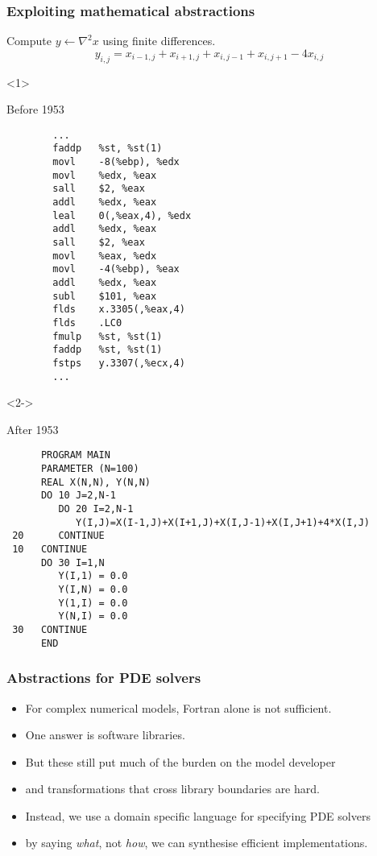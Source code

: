 \documentclass[presentation]{beamer}
\begin{document}
\begin{frame}[fragile]
  \frametitle{Exploiting mathematical abstractions}
  Compute $y \leftarrow \nabla^2 x$ using finite differences.
  \begin{equation*}
    y_{i,j} = x_{i-1, j} + x_{i+1, j} + x_{i, j-1} + x_{i, j+1} - 4x_{i,j}    
  \end{equation*}
  \begin{overlayarea}{\textwidth}{0.8\textheight}
  \begin{onlyenv}<1>
    \begin{block}{Before 1953}
\begin{verbatim}
        ...
        faddp   %st, %st(1)
        movl    -8(%ebp), %edx
        movl    %edx, %eax
        sall    $2, %eax
        addl    %edx, %eax
        leal    0(,%eax,4), %edx
        addl    %edx, %eax
        sall    $2, %eax
        movl    %eax, %edx
        movl    -4(%ebp), %eax
        addl    %edx, %eax
        subl    $101, %eax
        flds    x.3305(,%eax,4)
        flds    .LC0
        fmulp   %st, %st(1)
        faddp   %st, %st(1)
        fstps   y.3307(,%ecx,4)
        ...
\end{verbatim}
    \end{block}
  \end{onlyenv}
  \begin{onlyenv}<2->
    \begin{block}{After 1953}
\begin{verbatim}
      PROGRAM MAIN
      PARAMETER (N=100)
      REAL X(N,N), Y(N,N)
      DO 10 J=2,N-1
         DO 20 I=2,N-1
            Y(I,J)=X(I-1,J)+X(I+1,J)+X(I,J-1)+X(I,J+1)+4*X(I,J)
 20      CONTINUE
 10   CONTINUE
      DO 30 I=1,N
         Y(I,1) = 0.0
         Y(I,N) = 0.0
         Y(1,I) = 0.0
         Y(N,I) = 0.0
 30   CONTINUE
      END
\end{verbatim}
    \end{block}
  \end{onlyenv}
  \end{overlayarea}
\end{frame}

\begin{frame}
  \frametitle{Abstractions for PDE solvers}
  \begin{itemize}
  \item For complex numerical models, Fortran alone is not sufficient.
  \item One answer is software libraries.
  \item But these still put much of the burden on the model developer
  \item and transformations that cross library boundaries are hard.
  \item Instead, we use a domain specific language for specifying PDE
    solvers
  \item by saying \emph{what}, not \emph{how}, we can synthesise
    efficient implementations.
  \end{itemize}
\end{frame}
\end{document}
